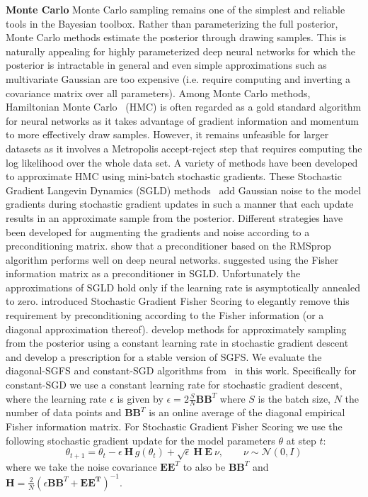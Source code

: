 \documentclass{article} \usepackage{iclr2018_conference,times}
\begin{document}
\textbf{Monte Carlo} Monte Carlo sampling remains one of the simplest and reliable tools in the Bayesian toolbox.  Rather than parameterizing the full posterior, Monte Carlo methods estimate the posterior through drawing samples.  This is naturally appealing for highly parameterized deep neural networks for which the posterior is intractable in general and even simple approximations such as multivariate Gaussian are too expensive (i.e. require computing and inverting a covariance matrix over all parameters).  Among Monte Carlo methods, Hamiltonian Monte Carlo~\citep{Neal1994} (HMC) is often regarded as a gold standard algorithm for neural networks as it takes advantage of gradient information and momentum to more effectively draw samples.  However, it remains unfeasible for larger datasets as it involves a Metropolis accept-reject step that requires computing the log likelihood over the whole data set.  A variety of methods have been developed to approximate HMC using mini-batch stochastic gradients.  These Stochastic Gradient Langevin Dynamics (SGLD) methods~\citep{Neal1994,WellingTeh2011} add Gaussian noise to the model gradients during stochastic gradient updates in such a manner that each update results in an approximate sample from the posterior. Different strategies have been developed for augmenting the gradients and noise according to a preconditioning matrix.  \cite{Li2016} show that a preconditioner based on the RMSprop algorithm performs well on deep neural networks.  \cite{Patterson2013} suggested using the Fisher information matrix as a preconditioner in SGLD.  Unfortunately the approximations of SGLD hold only if the learning rate is asymptotically annealed to zero. \cite{Ahn2013} introduced Stochastic Gradient Fisher Scoring to elegantly remove this requirement by preconditioning according to the Fisher information (or a diagonal approximation thereof).  \cite{Mandt2016} develop methods for approximately sampling from the posterior using a constant learning rate in stochastic gradient descent and develop a prescription for a stable version of SGFS.  We evaluate the diagonal-SGFS and constant-SGD algorithms from~\cite{Mandt2016} in this work.  Specifically for constant-SGD we use a constant learning rate for stochastic gradient descent, where the learning rate $\epsilon$ is given by $\epsilon=2\frac{S}{N}\mathbf{BB}^T$ where $S$ is the batch size, $N$ the number of data points and $\mathbf{BB}^T$ is an online average of the diagonal empirical Fisher information matrix.  For Stochastic Gradient Fisher Scoring we use the following stochastic gradient update for the model parameters $\theta$ at step $t$:
\begin{equation}
\theta_{t+1} = \theta_t - \epsilon \ \mathbf{H} \,g(\theta_t) + \sqrt{\epsilon} \  \mathbf{H} \ \mathbf{E} \ \nu, \qquad \nu \sim \mathcal{N}(0, I)
\end{equation}
where we take the noise covariance $\mathbf{EE}^T$ to also be $\mathbf{BB}^T$ and $\mathbf{H}=\frac{2}{N}(\epsilon\mathbf{B}\mathbf{B}^T + \mathbf{E}\mathbf{E^T})^{-1}$.
\end{document}
